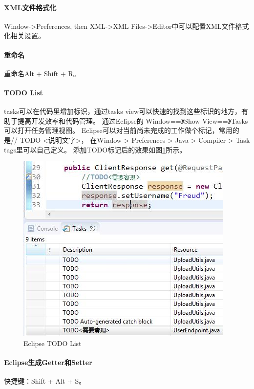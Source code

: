 \documentclass{book}
\begin{document}
\paragraph{XML文件格式化}

Window->Preferences, then XML->XML Files->Editor中可以配置XML文件格式化相关设置。

\paragraph{重命名}
重命名Alt + Shift + R。

\paragraph{TODO List}
tasks可以在代码里增加标识，通过tasks view可以快速的找到这些标识的地方，有助于提高开发效率和代码管理。
通过Eclipse的 Window==》Show View==》Tasks可以打开任务管理视图。
Eclipse可以对当前尚未完成的工作做个标记，常用的是// TODO <说明文字>，
在Window > Preferences > Java > Compiler > Task tags里可以自己定义。
添加TODO标记后的效果如图\ref{code:EclipseToDoList}所示。

\begin{figure}[htbp]
	\centering
	\includegraphics[scale=0.6]{EclipseToDoList.jpg}
	\caption{Eclipse TODO List}
	\label{code:EclipseToDoList}
\end{figure}

\paragraph{Eclipse生成Getter和Setter}

快捷键：Shift + Alt + S。
\end{document}
